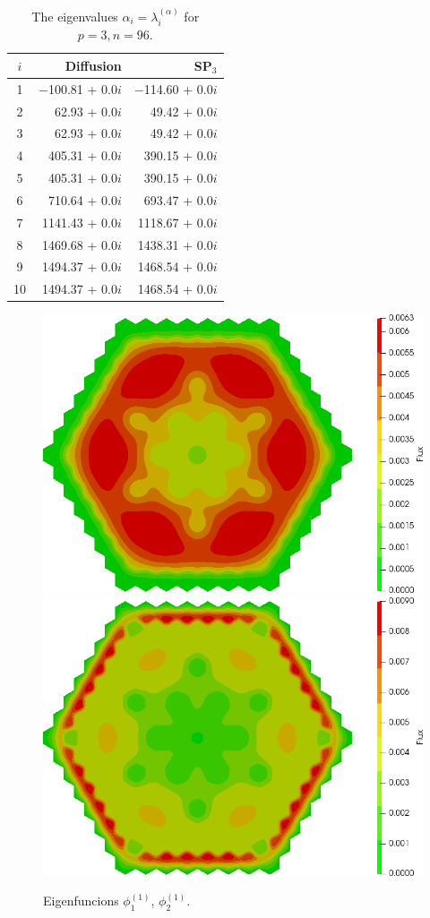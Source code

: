 \documentclass[authoryear]{elsarticle}
\begin{document}
\begin{table}[h]
\caption{The eigenvalues $\alpha_i=\lambda_i^{(\alpha)}$ for $p=3, n=96$.}
\label{tab:iaea_with_alpha_10}
\begin{center}
\begin{tabular}{c r r}
\hline
$i$ & Diffusion & SP$_3$ \\
\hline
1 &$-$100.81 + 0.0$i$&$-$114.60 + 0.0$i$ \\
2 &  62.93 + 0.0$i$& 49.42 + 0.0$i$ \\
3 &  62.93 + 0.0$i$& 49.42 + 0.0$i$ \\
4 & 405.31 + 0.0$i$&390.15 + 0.0$i$ \\
5 & 405.31 + 0.0$i$&390.15 + 0.0$i$ \\
6 & 710.64 + 0.0$i$&693.47 + 0.0$i$ \\
7 &1141.43 + 0.0$i$&1118.67 + 0.0$i$ \\
8 &1469.68 + 0.0$i$&1438.31 + 0.0$i$ \\
9 &1494.37 + 0.0$i$&1468.54 + 0.0$i$ \\
10&1494.37 + 0.0$i$&1468.54 + 0.0$i$ \\
\hline
\end{tabular}
\end{center}
\end{table}

\begin{figure}[h]
\begin{center}
	\includegraphics[width=0.49\linewidth]{iaea_with/alpha_sp3_u1_1.png}
	\includegraphics[width=0.49\linewidth]{iaea_with/alpha_sp3_u2_1.png}\\
	\caption{Eigenfuncions $\phi_1^{(1)}$, $\phi_2^{(1)}$.}
	\label{fig:iaea_with_fun_1}
\end{center}
\end{figure}
\end{document}
